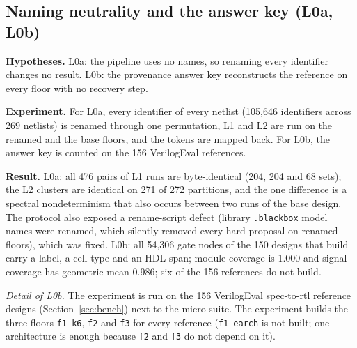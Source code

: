\documentclass[conference]{IEEEtran}
\newcommand{\hev}[1]{\par\smallskip\noindent\textbf{#1}}
\newcommand{\code}[1]{\texttt{#1}}
\begin{document}
\subsection{Naming neutrality and the answer key (L0a, L0b)}
\label{sec:veval-l0}

\hev{Hypotheses.} L0a: the pipeline uses no names, so renaming every identifier changes no
result. L0b: the provenance answer key reconstructs the reference on every floor with no recovery step.

\hev{Experiment.} For L0a, every identifier of every netlist (105,646 identifiers across 269
netlists) is renamed through one permutation, L1 and L2 are run on the renamed and the base floors, and
the tokens are mapped back. For L0b, the answer key is counted on the 156 VerilogEval references.

\hev{Result.} %
L0a: all 476 pairs of L1 runs are byte-identical (204, 204 and 68 sets); the L2 clusters are
identical on 271 of 272 partitions, and the one difference is a spectral nondeterminism that also
occurs between two runs of the base design. The protocol also exposed a rename-script defect
(library \code{.blackbox} model names were renamed, which silently removed every hard proposal on
renamed floors), which was fixed. L0b: all 54,306 gate nodes of the 150 designs that build carry a
label, a cell type and an HDL span; module coverage is 1.000 and signal coverage has geometric
mean 0.986; six of the 156 references do not build.


\emph{Detail of L0b.} The experiment is run on the 156 VerilogEval spec-to-rtl reference designs
(Section~\ref{sec:bench}) next to the micro suite. The experiment builds the three floors \code{f1-k6}, \code{f2} and
\code{f3} for every reference (\code{f1-earch} is not built; one architecture is enough
because \code{f2} and \code{f3} do not depend on it).
\end{document}
